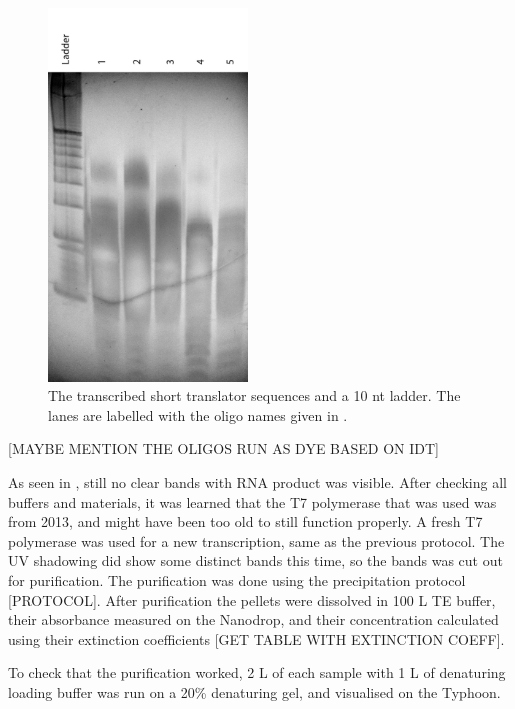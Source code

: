 \begin{figure}[H]
\centering
\includegraphics[width=150pt]{images/translator_transcription_3.png}
\caption{The transcribed short translator sequences and a 10 nt ladder. The lanes are labelled with the oligo names given in .}
\label{translator_transcription_3}
\end{figure}

[MAYBE MENTION THE OLIGOS RUN AS DYE BASED ON IDT]

As seen in , still no clear bands with RNA product was visible. After checking all buffers and materials, it was learned that the T7 polymerase that was used was from 2013, and might have been too old to still function properly. A fresh T7 polymerase was used for a new transcription, same as the previous protocol. The UV shadowing did show some distinct bands this time, so the bands was cut out for purification. The purification was done using the precipitation protocol [PROTOCOL]. After purification the pellets were dissolved in 100 \si{\micro}L TE buffer, their absorbance measured on the Nanodrop, and their concentration calculated using their extinction coefficients [GET TABLE WITH EXTINCTION COEFF].

To check that the purification worked, 2 \si{\micro}L of each sample with 1 \si{\micro}L of denaturing loading buffer was run on a 20\% denaturing gel, and visualised on the Typhoon.

